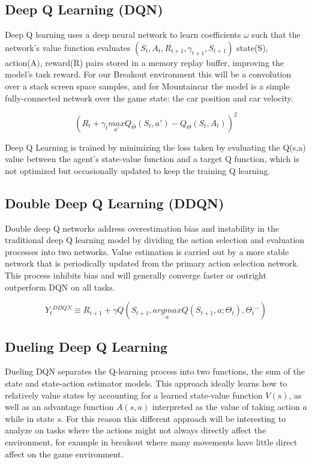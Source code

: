 \documentclass[conference]{IEEEtran}
\begin{document}
\subsection{Deep Q Learning (DQN)}
Deep Q learning uses a deep neural network to learn coefficients $\omega$ such that the network's value function evaluates $(S_{t}, A_{t}, R_{t+1},\gamma _{t+1},S_{t+1})$ state(S), action(A), reward(R) pairs stored in a memory replay buffer, improving the model's task reward. For our Breakout environment this will be a convolution over a stack screen space samples, and for Mountaincar the model is a simple fully-connected network over the game state: the car position and car velocity.

$$(R_{t} + \gamma _{t} \underset{{a}'}{max}Q_{\bar{\Theta }}(S_{t},{a}')-Q_{\Theta }(S_{t},A_{t}))^{2}$$

Deep Q Learning is trained by minimizing the loss taken by evaluating the Q(s,a) value between the agent's state-value function and a target Q function, which is not optimized but occasionally updated to keep the training Q learning.

\subsection{Double Deep Q Learning (DDQN)}
Double deep Q networks address overestimation bias and instability in the traditional deep Q learning model by dividing the action selection and evaluation processes into two networks.  Value estimation is carried out by a more stable network that is periodically updated from the primary action selection network. This process inhibits bias and will generally converge faster or outright outperform DQN on all tasks.

$$Y{_{t}}^{DDQN}\equiv R_{t+1}+\gamma Q(S_{t+1},\underset{a}{argmax}Q(S_{t+1},a;\Theta _{t}),\Theta {_{t}}^{-})$$

\subsection{Dueling Deep Q Learning}
Dueling DQN separates the Q-learning process into two functions, the sum of the state and state-action estimator models. This approach ideally learns how to relatively value states by accounting for a learned state-value function $V(s)$, as well as an advantage function $A(s,a)$ interpreted as the value of taking action $a$ while in state $s$. For this reason this different approach will be interesting to analyze on tasks where the actions might not always directly affect the environment, for example in breakout where many movements have little direct affect on the game environment.
\end{document}
